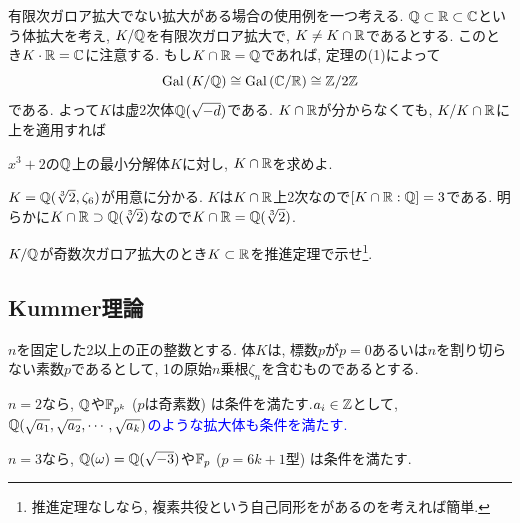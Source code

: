 \begin{eg}
有限次ガロア拡大でない拡大がある場合の使用例を一つ考える. $\mathbb{Q}\subset \mathbb{R}\subset \mathbb{C}$という体拡大を考え, $K/\mathbb{Q}$を有限次ガロア拡大で, $K\neq K\cap \mathbb{R}$であるとする. このとき$K\cdot \mathbb{R} = \mathbb{C}$に注意する. もし$K\cap \mathbb{R} = \mathbb{Q}$であれば, 定理の(1)によって
\[\operatorname{Gal}{(K/\mathbb{Q})}\cong \operatorname{Gal}{(\mathbb{C}/\mathbb{R})} \cong \mathbb{Z}/2\mathbb{Z}\]
である. よって$K$は虚2次体$\mathbb{Q}(\sqrt{-d})$である. $K\cap \mathbb{R}$が分からなくても, $K/K\cap \mathbb{R}$に上を適用すれば
\end{eg}
\begin{egprob} $x^3+2$の$\mathbb{Q}$上の最小分解体$K$に対し, $K\cap \mathbb{R}$を求めよ.
\end{egprob}
\begin{egans}
$K=\mathbb{Q}(\sqrt[3]{2}, \zeta_6)$が用意に分かる. $K$は$K\cap \mathbb{R}$上2次なので$[K\cap \mathbb{R}:\mathbb{Q}] = 3$である. 明らかに$K\cap \mathbb{R}\supset \mathbb{Q}(\sqrt[3]{2})$なので$K\cap \mathbb{R} = \mathbb{Q}(\sqrt[3]{2})$.
\end{egans}
\begin{prac}
$K/\mathbb{Q}$が奇数次ガロア拡大のとき$K\subset \mathbb{R}$を推進定理で示せ\footnote{推進定理なしなら, 複素共役という自己同形をがあるのを考えれば簡単. }.
\end{prac}







\subsection{Kummer理論}
\begin{assume} \label{assume:kummer}
$n$を固定した2以上の正の整数とする. 体$K$は, 標数$p$が$p=0$あるいは$n$を割り切らない素数$p$であるとして,  1の原始$n$乗根$\zeta_n$を含むものであるとする.
\end{assume}
\begin{eg}
\ben
\item $n=2$なら, $\mathbb{Q}$や$\mathbb{F}_{p^{k}}$ ($p$は奇素数) は条件を満たす.$a_i\in \mathbb{Z}$として, \textcolor{blue}{$\mathbb{Q}(\sqrt{a_1}, \sqrt{a_2}, \cdots, \sqrt{a_k})$のような拡大体も条件を満たす.}
\item $n=3$なら, $\mathbb{Q}(\omega) = \mathbb{Q}(\sqrt{-3})$や$\mathbb{F}_{p}$ ($p=6k+1$型) は条件を満たす.
\een
\end{eg}

